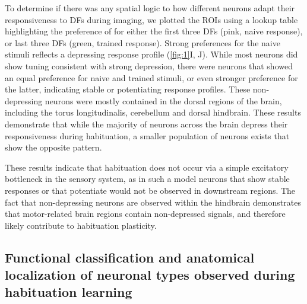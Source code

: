 \documentclass[9pt,lineno]{RandlettLab_elife}
\begin{document}
To determine if there was any spatial logic to how different neurons adapt their responsiveness to DFs during imaging, we plotted the ROIs using a lookup table highlighting the preference of for either the first three DFs (pink, naive response), or last three DFs (green, trained response). Strong preferences for the naive stimuli reflects a depressing response profile (\autoref{fig:1}I, J). While most neurons did show tuning consistent with strong depression, there were neurons that showed an equal preference for naive and trained stimuli, or even stronger preference for the latter, indicating stable or potentiating response profiles. These non-depressing neurons were mostly contained in the dorsal regions of the brain, including the torus longitudinalis, cerebellum and dorsal hindbrain. These results demonstrate that while the majority of neurons across the brain depress their responsiveness during habituation, a smaller population of neurons exists that show the opposite pattern. 

These results indicate that habituation does not occur via a simple excitatory bottleneck in the sensory system, as in such a model neurons that show stable responses or that potentiate would not be observed in downstream regions. The fact that non-depressing neurons are observed within the hindbrain demonstrates that motor-related brain regions contain non-depressed signals, and therefore likely contribute to habituation plasticity.

\subsection{Functional classification and anatomical localization of neuronal types observed during habituation learning}
\vspace{3mm}
\end{document}

